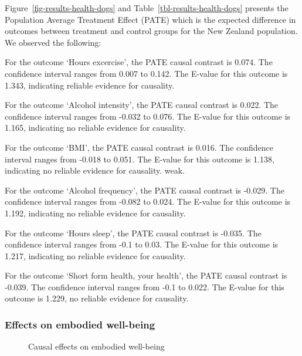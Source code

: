 \documentclass[
  singlecolumn,
  9pt]{article}
\begin{document}
\begin{table}
{\addtocounter{table}{-1}

}

\end{table}%

Figure~\ref{fig-results-health-dogs} and
Table~\ref{tbl-results-health-dogs} presents the Population Average
Treatment Effect (PATE) which is the expected difference in outcomes
between treatment and control groups for the New Zealand population. We
observed the following:

For the outcome `Hours excercise', the PATE causal contrast is 0.074.
The confidence interval ranges from 0.007 to 0.142. The E-value for this
outcome is 1.343, indicating reliable evidence for causality.

For the outcome `Alcohol intensity', the PATE causal contrast is 0.022.
The confidence interval ranges from -0.032 to 0.076. The E-value for
this outcome is 1.165, indicating no reliable evidence for causality.

For the outcome `BMI', the PATE causal contrast is 0.016. The confidence
interval ranges from -0.018 to 0.051. The E-value for this outcome is
1.138, indicating no reliable evidence for causality. weak.

For the outcome `Alcohol frequency', the PATE causal contrast is -0.029.
The confidence interval ranges from -0.082 to 0.024. The E-value for
this outcome is 1.192, indicating no reliable evidence for causality.

For the outcome `Hours sleep', the PATE causal contrast is -0.035. The
confidence interval ranges from -0.1 to 0.03. The E-value for this
outcome is 1.217, indicating no reliable evidence for causality.

For the outcome `Short form health, your health', the PATE causal
contrast is -0.039. The confidence interval ranges from -0.1 to 0.022.
The E-value for this outcome is 1.229, no reliable evidence for
causality.

\newpage{}

\subsubsection{Effects on embodied
well-being}\label{effects-on-embodied-well-being-1}

\begin{figure}


\caption{\label{fig-results-embodied-dogs}Causal effects on embodied
well-being}

\end{figure}%
\end{document}
